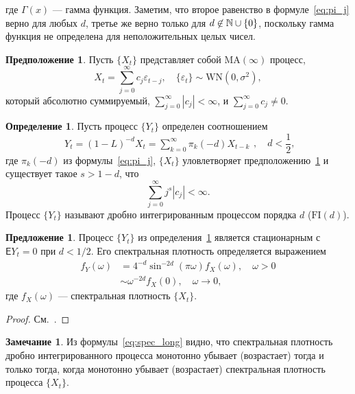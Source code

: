 \documentclass[specialist,
substylefile = spbu_report.rtx,
subf,href,colorlinks=true, 12pt]{disser}
\theoremstyle{definition}
\newtheorem{definition}{Определение}[section]
\newtheorem{remark}{Замечание}[section]
\newtheorem{assumption}{Предположение}[section]
\newtheorem{proposition}{Предложение}[section]
\begin{document}
где $\Gamma(x)$ --- гамма функция. Заметим, что второе равенство в формуле~\eqref{eq:pi_j} верно для любых $d$, третье же верно только для $d\not\in\mathbb{N}\cup\{0\}$, поскольку гамма функция не определена для неположительных целых чисел.
\begin{assumption}\label{as1}
	Пусть $\{X_t\}$ представляет собой $\mathrm{MA}(\infty)$ процесс,
	\[
		X_t=\sum_{j=0}^\infty c_j\varepsilon_{t-j},\quad \{\varepsilon_t\}\sim \mathrm{WN}(0, \sigma^2),
	\]
	который абсолютно суммируемый, $\sum_{j=0}^\infty |c_j|<\infty$, и $\sum_{j=0}^\infty c_j\ne0$.
\end{assumption}
\begin{definition}\label{def:FI}
	Пусть процесс $\{Y_t\}$ определен соотношением
	\[
		\begin{aligned}
			Y_t=(1-L)^{-d}X_t=\sum_{k=0}^\infty \pi_k(-d)X_{t-k}
		\end{aligned},\quad d<\frac{1}{2},
	\]
	где $\pi_k(-d)$ из формулы~\eqref{eq:pi_j}, $\{X_t\}$ уловлетворяет предположению~\ref{as1} и существует такое $s>1-d$, что
	\[
		\sum_{j=0}^\infty j^s|c_j|<\infty.
	\]
	Процесс $\{Y_t\}$ называют дробно интегрированным процессом порядка $d$ ($\mathrm{FI}(d)$).
\end{definition}
\begin{proposition}\label{prop1}
	Процесс $\{Y_t\}$ из определения~\ref{def:FI} является стационарным с $\mathsf{E}Y_t=0$ при $d<1/2$. Его спектральная плотность определяется выражением
	\begin{equation}\label{eq:spec_long}
		\begin{aligned}
			f_Y(\omega) & =4^{-d}\sin^{-2d}\left(\pi\omega\right)f_X(\omega),\quad\omega>0 \\
			            & \sim\omega^{-2d}f_X(0),\quad \omega\to0,
		\end{aligned}
	\end{equation}
	где $f_X(\omega)$ --- спектральная плотность $\{X_t\}$.
\end{proposition}
\begin{proof}
	См.~\cite[Proposition 6.1]{Hassler2018}.
\end{proof}
\begin{remark}
	Из формулы~\eqref{eq:spec_long} видно, что спектральная плотность дробно интегрированного процесса монотонно убывает (возрастает) тогда и только тогда, когда монотонно убывает (возрастает) спектральная плотность процесса $\{X_t\}$.
\end{remark}
\end{document}
